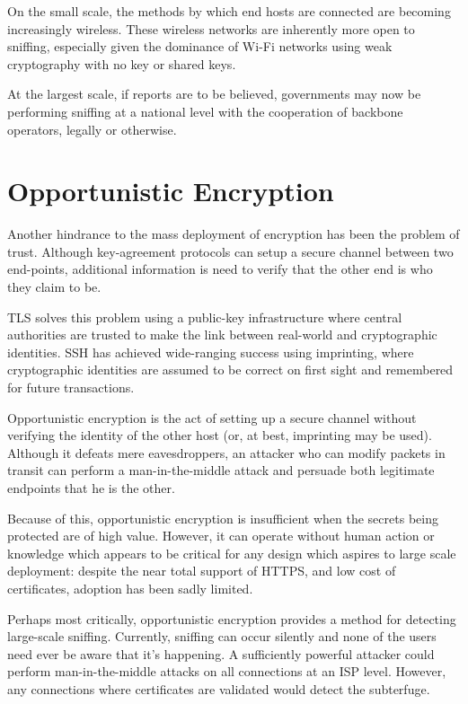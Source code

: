 \documentclass[conference]{IEEEtran}
\begin{document}
On the small scale, the methods by which end hosts are connected are becoming
increasingly wireless. These wireless networks are inherently more open to
sniffing, especially given the dominance of Wi-Fi networks using weak
cryptography\cite{wep} with no key or shared keys.

At the largest scale, if reports are to be believed, governments may now be
performing sniffing at a national level with the cooperation of backbone
operators, legally or otherwise.

\section{Opportunistic Encryption}

Another hindrance to the mass deployment of encryption has been the problem of
trust. Although key-agreement protocols can setup a secure channel between two
end-points, additional information is need to verify that the other end is who
they claim to be.

TLS solves this problem using a public-key infrastructure where central
authorities are trusted to make the link between real-world and cryptographic identities.
SSH has achieved wide-ranging success using imprinting,
where cryptographic identities are assumed to be correct on first sight and
remembered for future transactions.

Opportunistic encryption is the act of setting up a secure channel without
verifying the identity of the other host (or, at best, imprinting may be used).
Although it defeats mere eavesdroppers, an attacker who can modify packets in
transit can perform a man-in-the-middle attack and persuade both legitimate
endpoints that he is the other.

Because of this, opportunistic encryption is insufficient when the secrets
being protected are of high value. However, it can operate without human
action or knowledge which appears to be critical for any design which aspires
to large scale deployment: despite the near total support of HTTPS, and low
cost of certificates, adoption has been sadly limited.

Perhaps most critically, opportunistic encryption provides a method for
detecting large-scale sniffing. Currently, sniffing can occur silently and none
of the users need ever be aware that it's happening. A sufficiently
powerful attacker could perform man-in-the-middle attacks on all connections at
an ISP level. However, any connections where certificates are validated would
detect the subterfuge.
\end{document}
